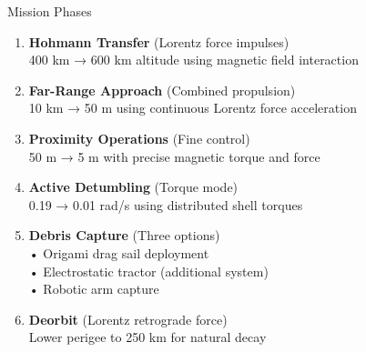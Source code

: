 \documentclass[aspectratio=169]{beamer}
\begin{document}
\begin{frame}{Mission Phases}
\begin{enumerate}
    \item \textbf{Hohmann Transfer} (Lorentz force impulses)\\
          400 km → 600 km altitude using magnetic field interaction

    \item \textbf{Far-Range Approach} (Combined propulsion)\\
          10 km → 50 m using continuous Lorentz force acceleration

    \item \textbf{Proximity Operations} (Fine control)\\
          50 m → 5 m with precise magnetic torque and force

    \item \textbf{Active Detumbling} (Torque mode)\\
          0.19 → 0.01 rad/s using distributed shell torques

    \item \textbf{Debris Capture} (Three options)\\
          • Origami drag sail deployment\\
          • Electrostatic tractor (additional system)\\
          • Robotic arm capture

    \item \textbf{Deorbit} (Lorentz retrograde force)\\
          Lower perigee to 250 km for natural decay
\end{enumerate}
\end{frame}
\end{document}
